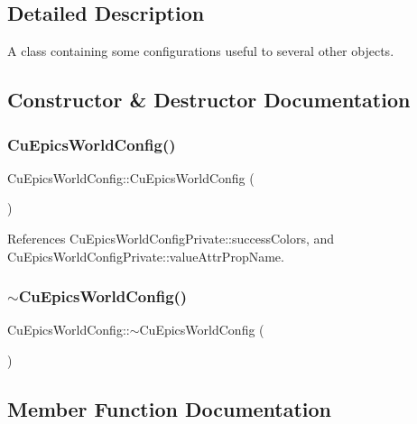 \subsection{Detailed Description}
A class containing some configurations useful to several other objects. 

\subsection{Constructor \& Destructor Documentation}
\mbox{\label{classCuEpicsWorldConfig_abf49532d05fceb6a071dcfd81065a3b4}} 
\subsubsection{Cu\+Epics\+World\+Config()}
{\footnotesize\ttfamily Cu\+Epics\+World\+Config\+::\+Cu\+Epics\+World\+Config (\begin{DoxyParamCaption}{ }\end{DoxyParamCaption})}



References Cu\+Epics\+World\+Config\+Private\+::success\+Colors, and Cu\+Epics\+World\+Config\+Private\+::value\+Attr\+Prop\+Name.

\mbox{\label{classCuEpicsWorldConfig_ad0dc7ec16ef0f9183cafe09a20870147}} 
\subsubsection{$\sim$\+Cu\+Epics\+World\+Config()}
{\footnotesize\ttfamily Cu\+Epics\+World\+Config\+::$\sim$\+Cu\+Epics\+World\+Config (\begin{DoxyParamCaption}{ }\end{DoxyParamCaption})\hspace{0.3cm}{\ttfamily [virtual]}}



\subsection{Member Function Documentation}
\mbox{\label{classCuEpicsWorldConfig_a7241b21109d73cbe5757359c84b35657}} 
